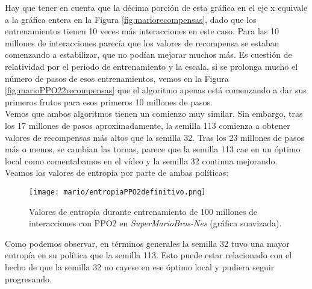 \documentclass[11pt,fleqn]{book} %
\begin{document}
Hay que tener en cuenta que la décima porción de esta gráfica en el eje x equivale a la gráfica entera en la Figura \ref{fig:mariorecompensas}, dado que los entrenamientos tienen 10 veces más interacciones en este caso. Para las 10 millones de interacciones parecía que los valores de recompensa se estaban comenzando a estabilizar, que no podían mejorar muchos más. Es cuestión de relatividad por el periodo de entrenamiento y la escala, si se prolonga mucho el número de pasos de esos entrenamientos, vemos en la Figura \ref{fig:marioPPO22recompensas} que el algoritmo apenas está comenzando a dar sus primeros frutos para esos primeros 10 millones de pasos. \\

Vemos que ambos algoritmos tienen un comienzo muy similar. Sin embargo, tras los 17 millones de pasos aproximadamente, la semilla 113 comienza a obtener valores de recompensas más altos que la semilla 32. Tras los 23 millones de pasos más o menos, se cambian las tornas, parece que la semilla 113 cae en un óptimo local como comentabamos en el vídeo y la semilla 32 continua mejorando. \\

Veamos los valores de entropía por parte de ambas políticas:

\begin{figure}[H]
	\centering\texttt{[image: mario/entropiaPPO2definitivo.png]}
	\caption{Valores de entropía durante entrenamiento de 100 millones de interacciones con PPO2 en \textit{SuperMarioBros-Nes} (gráfica suavizada).}
	\label{fig:marioPPO22episodios} %
\end{figure}

Como podemos observar, en términos generales la semilla 32 tuvo una mayor entropía en su política que la semilla 113. Esto puede estar relacionado con el hecho de que la semilla 32 no cayese en ese óptimo local y pudiera seguir progresando.




 
\end{document}
